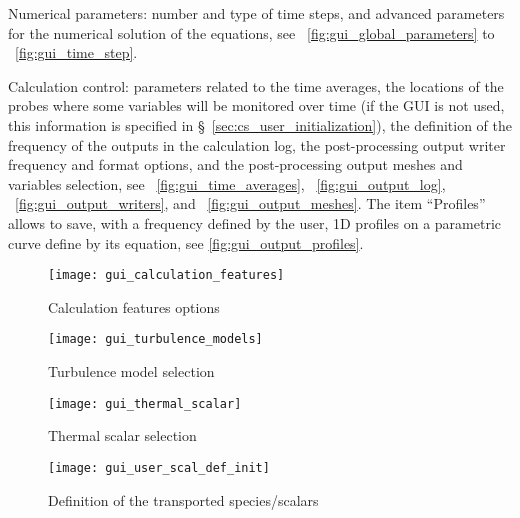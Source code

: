 {{{\begin{list}{-}{}
\item Numerical parameters: number and type of time steps, and advanced parameters for the numerical solution of the equations,
see \figurename~\ref{fig:gui_global_parameters} to \figurename~\ref{fig:gui_time_step}.
\item Calculation control: parameters related to the time averages, the
      locations of the probes where some variables will be monitored over time
      (if the GUI is not used, this information is specified in \S~\ref{sec:cs_user_initialization}),
       the definition of the frequency of the outputs in the calculation
      log, the post-processing output writer frequency and format options, and
      the post-processing output meshes and variables selection, see
      \figurename~\ref{fig:gui_time_averages}, \figurename~\ref{fig:gui_output_log}, \figurename~\ref{fig:gui_output_writers},
      and \figurename~\ref{fig:gui_output_meshes}. The item ``Profiles'' allows to save, with a
      frequency defined by the user, 1D profiles on a parametric curve define by its equation, see \figurename\ref{fig:gui_output_profiles}.
\end{list}

\begin{figure}[!ht]
\begin{center}
\texttt{[image: gui\_calculation\_features]}
\caption{Calculation features options}
\label{fig:gui_calculation_features}
\end{center}
\end{figure}

\begin{figure}[!ht]
\begin{center}
\texttt{[image: gui\_turbulence\_models]}
\caption{Turbulence model selection}
\label{fig:gui_turbulence_models}
\end{center}
\end{figure}

\begin{figure}[!ht]
\begin{center}
\texttt{[image: gui\_thermal\_scalar]}
\caption{Thermal scalar selection}
\label{fig:gui_thermal_scalar}
\end{center}
\end{figure}

\begin{figure}[!ht]
\begin{center}
\texttt{[image: gui\_user\_scal\_def\_init]}
\caption{Definition of the transported species/scalars}
\label{fig:gui_species}
\end{center}
\end{figure}

}}}

